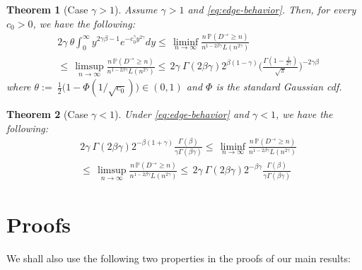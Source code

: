 \documentclass[preprint]{imsart}
\newcommand{\PP}{\mathbb{P}}
\newcommand{\1}{\mathbf{1}}
\theoremstyle{plain}
\newtheorem{theorem}{Theorem}[section]
\theoremstyle{definition}
\begin{document}
\begin{theorem}[Case \(\gamma>1\)]\label{thm:gamma>1-final-EN-eps}
Assume \(\gamma>1\) and \eqref{eq:edge-behavior}. Then, for every $c_0>0$, we have the following:
\begin{equation}\label{lim_gamma>1}
    \begin{split}
       &2\gamma\ \theta \int_{0}^{\infty}y^{2\gamma\beta-1}e^{-c_0^{\gamma}y^{2\gamma}}dy\le\,\liminf_{n\to \infty} \frac{n\,\PP(D^{\rightarrow}\ge n)}{n^{1-2\beta\gamma}L(n^{2\gamma})}\\
       &\le\,\limsup_{n\to \infty} \frac{n\,\PP(D^{\rightarrow}\ge n)}{n^{1-2\beta\gamma}L(n^{2\gamma})}\le\,2\gamma\ \Gamma(2\beta\gamma)2^{\beta(1-\gamma)}\Bigg(\frac{\Gamma(1-\frac{1}{2\gamma})}{\sqrt{\pi}}\Bigg)^{-2\gamma\beta}
    \end{split}
\end{equation}
where \(\theta:=\ \tfrac12\big(1-\Phi(1/\sqrt{c_0})\big)\in(0,1)\) and $\Phi$ is the standard Gaussian cdf. 
\end{theorem}




\begin{theorem}[Case \(\gamma<1\)]\label{thm:gamma<1-final-EN-eps}
Under \eqref{eq:edge-behavior} and \(\gamma<1\), we have the following:
\begin{equation}\label{lim_gamma_1}
    \begin{split}
       &2\gamma\ \Gamma(2\beta\gamma)2^{-\beta(1+\gamma)}\frac{\Gamma(\beta)}{\gamma\Gamma(\beta\gamma)}\le\,\liminf_{n\to \infty} \frac{n\,\PP(D^{\rightarrow}\ge n)}{n^{1-2\beta\gamma}L(n^{2\gamma})}\\
       &\le\,\limsup_{n\to \infty} \frac{n\,\PP(D^{\rightarrow}\ge n)}{n^{1-2\beta\gamma}L(n^{2\gamma})}\le\,2\gamma\ \Gamma(2\beta\gamma)2^{-\beta\gamma}\frac{\Gamma(\beta)}{\gamma\Gamma(\beta\gamma)}
    \end{split}
\end{equation}

\end{theorem}






\section{Proofs}\label{results}



We shall also use the following two properties in the proofs of our main results:
\end{document}
